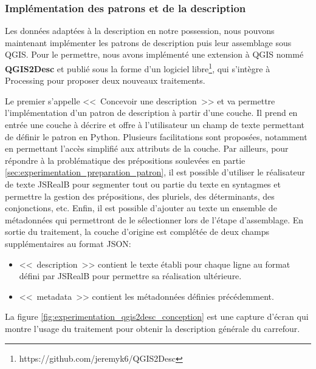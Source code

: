 \subsubsection{Implémentation des patrons et de la description}

\label{sec:experimentation_implémentation_patron}

Les données adaptées à la description en notre possession, nous pouvons maintenant implémenter les patrons de description puis leur assemblage sous QGIS. Pour le permettre, nous avons implémenté une extension à QGIS nommé \textbf{QGIS2Desc} et publié sous la forme d’un logiciel libre\footnote{https://github.com/jeremyk6/QGIS2Desc}, qui s'intègre à Processing pour proposer deux nouveaux traitements.

\newpar{}

Le premier s'appelle <<~Concevoir une description~>> et va permettre l'implémentation d'un patron de description à partir d'une couche. Il prend en entrée une couche à décrire et offre à l'utilisateur un champ de texte permettant de définir le patron en Python. Plusieurs facilitations sont proposées, notamment en permettant l'accès simplifié aux attributs de la couche. Par ailleurs, pour répondre à la problématique des prépositions soulevées en partie \ref{sec:experimentation_preparation_patron}, il est possible d'utiliser le réalisateur de texte JSRealB \citep{molins2015} pour segmenter tout ou partie du texte en syntagmes et permettre la gestion des prépositions, des pluriels, des déterminants, des conjonctions, etc. Enfin, il est possible d'ajouter au texte un ensemble de métadonnées qui permettront de le sélectionner lors de l'étape d'assemblage. En sortie du traitement, la couche d'origine est complétée de deux champs supplémentaires au format JSON:

\begin{itemize}
    \item <<~description~>> contient le texte établi pour chaque ligne au format défini par JSRealB pour permettre sa réalisation ultérieure.
    \item <<~metadata~>> contient les métadonnées définies précédemment.
\end{itemize}

\newpar{}

La figure \ref{fig:experimentation_qgis2desc_conception} est une capture d'écran qui montre l'usage du traitement pour obtenir la description générale du carrefour.

